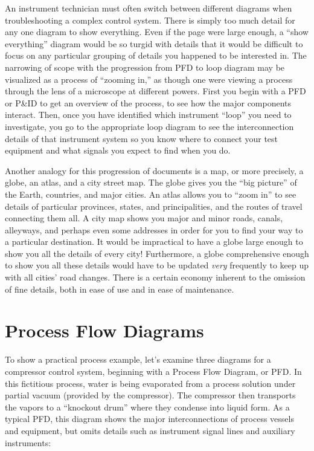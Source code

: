 \vskip 10pt

An instrument technician must often switch between different diagrams when troubleshooting a complex control system.  There is simply too much detail for any one diagram to show everything.  Even if the page were large enough, a ``show everything'' diagram would be so turgid with details that it would be difficult to focus on any particular grouping of details you happened to be interested in.  The narrowing of scope with the progression from PFD to loop diagram may be visualized as a process of ``zooming in,'' as though one were viewing a process through the lens of a microscope at different powers.  First you begin with a PFD or P\&ID to get an overview of the process, to see how the major components interact.  Then, once you have identified which instrument ``loop'' you need to investigate, you go to the appropriate loop diagram to see the interconnection details of that instrument system so you know where to connect your test equipment and what signals you expect to find when you do.

Another analogy for this progression of documents is a map, or more precisely, a globe, an atlas, and a city street map.  The globe gives you the ``big picture'' of the Earth, countries, and major cities.  An atlas allows you to ``zoom in'' to see details of particular provinces, states, and principalities, and the routes of travel connecting them all.  A city map shows you major and minor roads, canals, alleyways, and perhaps even some addresses in order for you to find your way to a particular destination.  It would be impractical to have a globe large enough to show you all the details of every city!  Furthermore, a globe comprehensive enough to show you all these details would have to be updated \textit{very} frequently to keep up with all cities' road changes.  There is a certain economy inherent to the omission of fine details, both in ease of use and in ease of maintenance.










\filbreak
\section{Process Flow Diagrams}

To show a practical process example, let's examine three diagrams for a compressor control system, beginning with a Process Flow Diagram, or PFD.  In this fictitious process, water is being evaporated from a process solution under partial vacuum (provided by the compressor).  The compressor then transports the vapors to a ``knockout drum'' where they condense into liquid form.  As a typical PFD, this diagram shows the major interconnections of process vessels and equipment, but omits details such as instrument signal lines and auxiliary instruments:    

